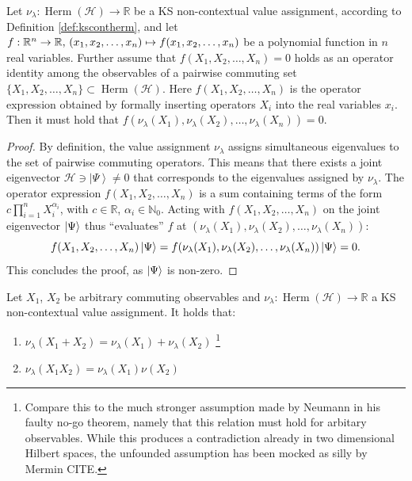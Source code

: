 \begin{lemma}\label{lem:funcconsist}\hfill\break Let $\nu_{\lambda}:\operatorname{Herm}(\mathcal{H})\rightarrow\mathbb{\mathbb{R}}$ be a KS non-contextual value assignment, according to Definition \ref{def:kscontherm}, and let $f:\mathbb{R}^{n}\rightarrow\mathbb{R},\thinspace(x_{1},x_{2},\dots,x_{n})\mapsto f(x_{1},x_{2},\dots,x_{n})$ be a polynomial function in $n$ real variables. Further assume that $f(X_{1},X_{2},\dots,X_{n})=0$ holds as an operator identity among the observables of a pairwise commuting set $\{X_{1},X_{2},\dots,X_{n}\}\subset\operatorname{Herm}(\mathcal{H})$. Here $f(X_{1},X_{2},\dots,X_{n})$ is the operator expression obtained by formally inserting operators $X_{i}$ into the real variables $x_{i}$. Then it must hold that $f(\nu_{\lambda}(X_{1}),\nu_{\lambda}(X_{2}),\dots,\nu_{\lambda}(X_{n}))=0$. 
\end{lemma}

\begin{proof}
By definition, the value assignment $\nu_{\lambda}$ assigns simultaneous eigenvalues to the set of pairwise commuting operators. This means that there exists a joint eigenvector $\mathcal{H}\ni\left|\Psi\right\rangle \neq0$ that corresponds to the eigenvalues assigned by $\nu_{\lambda}$. The operator expression $f(X_{1},X_{2},\dots,X_{n})$ is a sum containing terms of the form $c\prod_{i=1}^{n}X_{i}^{\alpha_{i}}$, with $c\in\mathbb{R}$, $\alpha_{i}\in\mathbb{N}_{0}$. Acting with $f(X_{1},X_{2},\dots,X_{n})$ on the joint eigenvector $\ket{\Psi}$ thus “evaluates” $f$ at $(\nu_{\lambda}(X_{1}),\nu_{\lambda}(X_{2}),\dots,\nu_{\lambda}(X_{n})):$\begin{equation*}
f(X_{1},X_{2},\dots,X_{n})\ket{\Psi} =f(\nu_{\lambda}(X_{1}),\nu_{\lambda}(X_{2}),\dots,\nu_{\lambda}(X_{n}))\ket{\Psi} =0.\end{equation*} This concludes the proof, as $\ket{\Psi}$  is non-zero.
\end{proof}

\begin{corollary}
\label{cor:funcconsist}
Let $X_1$, $X_2$ be arbitrary commuting observables and $\nu_{\lambda}:\operatorname{Herm}(\mathcal{H})\rightarrow\mathbb{R}$ a KS non-contextual value assignment. It holds that:
\begin{enumerate}
\item{$\nu_{\lambda}(X_1+X_2)=\nu_{\lambda}(X_1)+\nu_{\lambda}(X_2)$ \footnote{Compare this to the much stronger assumption made by Neumann in his faulty no-go theorem, namely that this relation must hold for arbitary observables. While this produces a contradiction already in two dimensional Hilbert spaces, the unfounded assumption has been mocked as silly by Mermin CITE.}}
\item{$\nu_{\lambda}(X_1X_2)=\nu_{\lambda}(X_1)\nu(X_2)$}
\end{enumerate}
\end{corollary}

